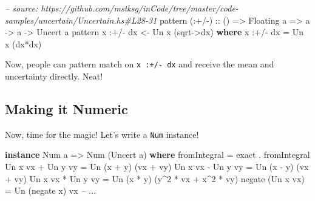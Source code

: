 \documentclass[]{article}
\newenvironment{Shaded}{}{}
\newcommand{\KeywordTok}[1]{\textcolor[rgb]{0.00,0.44,0.13}{\textbf{{#1}}}}
\newcommand{\DataTypeTok}[1]{\textcolor[rgb]{0.56,0.13,0.00}{{#1}}}
\newcommand{\DecValTok}[1]{\textcolor[rgb]{0.25,0.63,0.44}{{#1}}}
\newcommand{\CommentTok}[1]{\textcolor[rgb]{0.38,0.63,0.69}{\textit{{#1}}}}
\newcommand{\OtherTok}[1]{\textcolor[rgb]{0.00,0.44,0.13}{{#1}}}
\newcommand{\FunctionTok}[1]{\textcolor[rgb]{0.02,0.16,0.49}{{#1}}}
\newcommand{\NormalTok}[1]{{#1}}
\begin{document}
\begin{Shaded}
\begin{Highlighting}[]
\CommentTok{-- source: https://github.com/mstksg/inCode/tree/master/code-samples/uncertain/Uncertain.hs#L28-31}
\NormalTok{pattern}\OtherTok{ (:+/-) ::} \NormalTok{() }\OtherTok{=>} \DataTypeTok{Floating} \NormalTok{a }\OtherTok{=>} \NormalTok{a }\OtherTok{->} \NormalTok{a }\OtherTok{->} \DataTypeTok{Uncert} \NormalTok{a}
\NormalTok{pattern x }\FunctionTok{:+/-} \NormalTok{dx }\OtherTok{<-} \DataTypeTok{Un} \NormalTok{x (sqrt}\OtherTok{->}\NormalTok{dx)}
  \KeywordTok{where}
    \NormalTok{x }\FunctionTok{:+/-} \NormalTok{dx }\FunctionTok{=} \DataTypeTok{Un} \NormalTok{x (dx}\FunctionTok{*}\NormalTok{dx)}
\end{Highlighting}
\end{Shaded}

Now, people can pattern match on \texttt{x\ :+/-\ dx} and receive the
mean and uncertainty directly. Neat!

\subsection{Making it Numeric}\label{making-it-numeric}

Now, time for the magic! Let's write a \texttt{Num} instance!

\begin{Shaded}
\begin{Highlighting}[]
\KeywordTok{instance} \DataTypeTok{Num} \NormalTok{a }\OtherTok{=>} \DataTypeTok{Num} \NormalTok{(}\DataTypeTok{Uncert} \NormalTok{a) }\KeywordTok{where}
    \NormalTok{fromIntegral      }\FunctionTok{=} \NormalTok{exact }\FunctionTok{.} \NormalTok{fromIntegral}
    \DataTypeTok{Un} \NormalTok{x vx }\FunctionTok{+} \DataTypeTok{Un} \NormalTok{y vy }\FunctionTok{=} \DataTypeTok{Un} \NormalTok{(x }\FunctionTok{+} \NormalTok{y)    (vx }\FunctionTok{+} \NormalTok{vy)}
    \DataTypeTok{Un} \NormalTok{x vx }\FunctionTok{-} \DataTypeTok{Un} \NormalTok{y vy }\FunctionTok{=} \DataTypeTok{Un} \NormalTok{(x }\FunctionTok{-} \NormalTok{y)    (vx }\FunctionTok{+} \NormalTok{vy)}
    \DataTypeTok{Un} \NormalTok{x vx }\FunctionTok{*} \DataTypeTok{Un} \NormalTok{y vy }\FunctionTok{=} \DataTypeTok{Un} \NormalTok{(x }\FunctionTok{*} \NormalTok{y)    (y}\FunctionTok{^}\DecValTok{2} \FunctionTok{*} \NormalTok{vx }\FunctionTok{+} \NormalTok{x}\FunctionTok{^}\DecValTok{2} \FunctionTok{*} \NormalTok{vy)}
    \NormalTok{negate (}\DataTypeTok{Un} \NormalTok{x vx)  }\FunctionTok{=} \DataTypeTok{Un} \NormalTok{(negate x) vx}
    \CommentTok{-- ...}
\end{Highlighting}
\end{Shaded}
\end{document}
